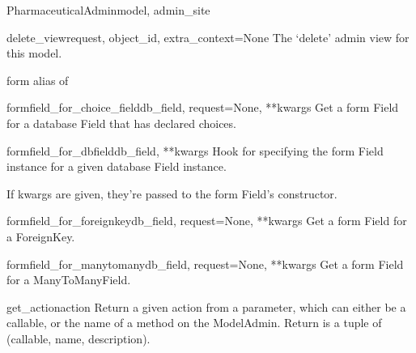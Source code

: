 \documentclass[letterpaper,10pt,english]{sphinxmanual}
\begin{document}
\begin{classdesc}{PharmaceuticalAdmin}{model, admin\_site}
\hypertarget{data.admin.PharmaceuticalAdmin.delete_view}{}\begin{methoddesc}{delete\_view}{request, object\_id, extra\_context=None}
The `delete' admin view for this model.
\end{methoddesc}

\hypertarget{data.admin.PharmaceuticalAdmin.form}{}\begin{memberdesc}{form}
alias of 
\end{memberdesc}

\hypertarget{data.admin.PharmaceuticalAdmin.formfield_for_choice_field}{}\begin{methoddesc}{formfield\_for\_choice\_field}{db\_field, request=None, **kwargs}
Get a form Field for a database Field that has declared choices.
\end{methoddesc}

\hypertarget{data.admin.PharmaceuticalAdmin.formfield_for_dbfield}{}\begin{methoddesc}{formfield\_for\_dbfield}{db\_field, **kwargs}
Hook for specifying the form Field instance for a given database Field
instance.

If kwargs are given, they're passed to the form Field's constructor.
\end{methoddesc}

\hypertarget{data.admin.PharmaceuticalAdmin.formfield_for_foreignkey}{}\begin{methoddesc}{formfield\_for\_foreignkey}{db\_field, request=None, **kwargs}
Get a form Field for a ForeignKey.
\end{methoddesc}

\hypertarget{data.admin.PharmaceuticalAdmin.formfield_for_manytomany}{}\begin{methoddesc}{formfield\_for\_manytomany}{db\_field, request=None, **kwargs}
Get a form Field for a ManyToManyField.
\end{methoddesc}

\hypertarget{data.admin.PharmaceuticalAdmin.get_action}{}\begin{methoddesc}{get\_action}{action}
Return a given action from a parameter, which can either be a callable,
or the name of a method on the ModelAdmin.  Return is a tuple of
(callable, name, description).
\end{methoddesc}


\end{classdesc}
\end{document}
